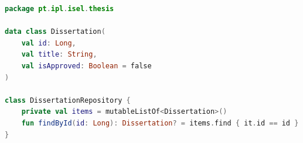 \begin{lstlisting}[language=Kotlin, caption={Sample Kotlin data class and repository.}, label={lst:kotlin_example}]
package pt.ipl.isel.thesis

data class Dissertation(
    val id: Long,
    val title: String,
    val isApproved: Boolean = false
)

class DissertationRepository {
    private val items = mutableListOf<Dissertation>()
    fun findById(id: Long): Dissertation? = items.find { it.id == id }
}
\end{lstlisting}
